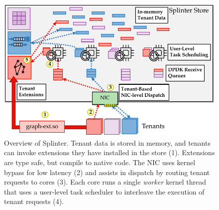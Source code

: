 \begin{figure}[t]
  \includegraphics[width=1.0\columnwidth]{figures/splinter-arch.pdf}
  \caption{Overview of Splinter. Tenant data is stored in
  memory, and tenants can invoke extensions they have installed in the store (\textcircled{\footnotesize{1}}).
  Extensions are type safe, but compile to native code. The NIC uses
  kernel bypass for low latency (\textcircled{\footnotesize{2}}) and assists in dispatch by routing tenant
  requests to cores (\textcircled{\footnotesize{3}}). Each core runs
  a single {\sl worker} kernel thread that uses a user-level task scheduler to interleave
  the execution of tenant requests (\textcircled{\footnotesize{4}}).}
  \label{fig:arch}
\end{figure}
